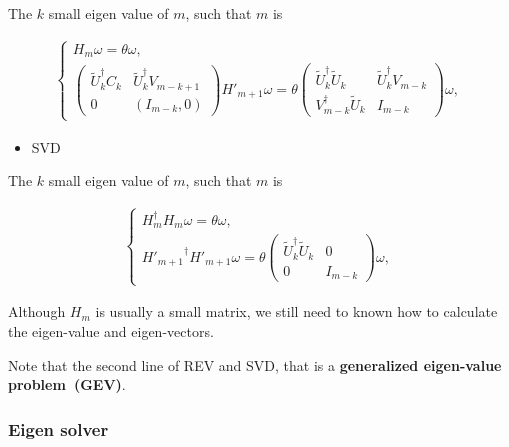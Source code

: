 The $k$ small eigen value of $m$, such that $m$ is

\begin{equation}
\begin{split}
\left\{\begin{array}{l}
H_m\omega = \theta \omega,\\
\left(\begin{array}{cc} \tilde{U}_k^{\dagger}C_k & \tilde{U}_k^{\dagger}V_{m-k+1} \\ 0 & (I_{m-k},0)\end{array}\right) H'_{m+1}\omega = \theta \left(\begin{array}{cc} \tilde{U}_k^{\dagger}\tilde{U}_{k}  & \tilde{U}_k^{\dagger}V_{m-k} \\ V_{m-k}^{\dagger}\tilde{U}_k & I_{m-k}\end{array}\right)\omega,
\end{array}\right.
\end{split}
\end{equation}

\begin{itemize}
  \item SVD
\end{itemize}

The $k$ small eigen value of $m$, such that $m$ is

\begin{equation}
\begin{split}
\left\{\begin{array}{l}
H_m^{\dagger}H_m\omega = \theta \omega,\\
{H'_{m+1}}^{\dagger}H'_{m+1}\omega = \theta \left(\begin{array}{cc} \tilde{U}_k^{\dagger}\tilde{U}_{k}  & 0 \\ 0 & I_{m-k}\end{array}\right)\omega,
\end{array}\right.
\end{split}
\end{equation}

Although $H_m$ is usually a small matrix, we still need to known how to calculate the eigen-value and eigen-vectors.

Note that the second line of REV and SVD, that is a \textbf{generalized eigen-value problem~(GEV)}.

\subsubsection{\label{sec:eigenSolver}Eigen solver}


